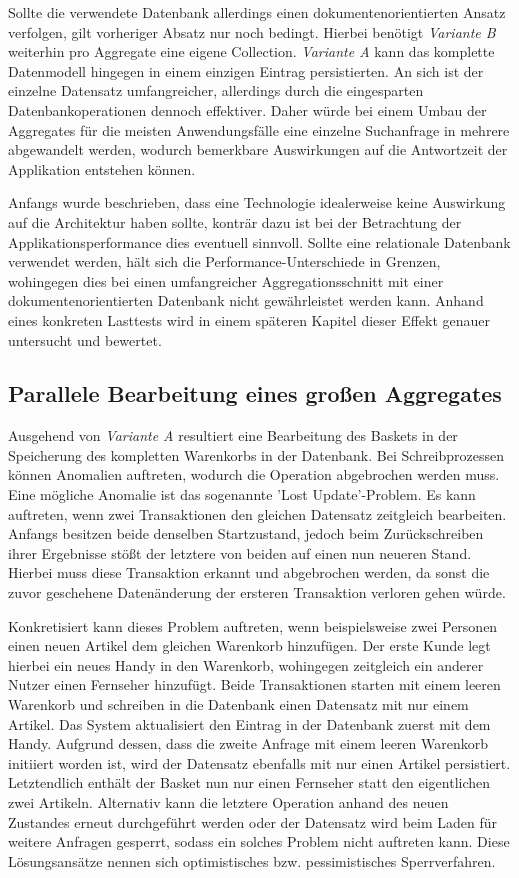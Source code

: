 Sollte die verwendete Datenbank allerdings einen dokumentenorientierten Ansatz verfolgen, gilt vorheriger Absatz nur noch bedingt. Hierbei benötigt \emph{Variante B} weiterhin pro Aggregate eine eigene \gls{Collection}. \emph{Variante A} kann das komplette Datenmodell hingegen in einem einzigen Eintrag persistierten. An sich ist der einzelne Datensatz umfangreicher, allerdings durch die eingesparten Datenbankoperationen dennoch effektiver. Daher würde bei einem Umbau der Aggregates für die meisten Anwendungsfälle eine einzelne Suchanfrage in mehrere abgewandelt werden, wodurch bemerkbare Auswirkungen auf die Antwortzeit der Applikation entstehen können. 

Anfangs wurde beschrieben, dass eine Technologie idealerweise keine Auswirkung auf die Architektur haben sollte, konträr dazu ist bei der Betrachtung der Applikationsperformance dies eventuell sinnvoll. Sollte eine relationale Datenbank verwendet werden, hält sich die Performance-Unterschiede in Grenzen, wohingegen dies bei einen umfangreicher Aggregationsschnitt mit einer dokumentenorientierten Datenbank nicht gewährleistet werden kann. Anhand eines konkreten Lasttests wird in einem späteren Kapitel dieser Effekt genauer untersucht und bewertet.

\subsection{Parallele Bearbeitung eines großen Aggregates}

Ausgehend von \emph{Variante A} resultiert eine Bearbeitung des Baskets in der Speicherung des kompletten Warenkorbs in der Datenbank. Bei Schreibprozessen können Anomalien auftreten, wodurch die Operation abgebrochen werden muss. Eine mögliche Anomalie ist das sogenannte 'Lost Update'-Problem. Es kann auftreten, wenn zwei Transaktionen den gleichen Datensatz zeitgleich bearbeiten. Anfangs besitzen beide denselben Startzustand, jedoch beim Zurückschreiben ihrer Ergebnisse stößt der letztere von beiden auf einen nun neueren Stand. Hierbei muss diese Transaktion erkannt und abgebrochen werden, da sonst die zuvor geschehene Datenänderung der ersteren Transaktion verloren gehen würde.

Konkretisiert kann dieses Problem auftreten, wenn beispielsweise zwei Personen einen neuen Artikel dem gleichen Warenkorb hinzufügen. Der erste Kunde legt hierbei ein neues Handy in den Warenkorb, wohingegen zeitgleich ein anderer Nutzer einen Fernseher hinzufügt. Beide Transaktionen starten mit einem leeren Warenkorb und schreiben in die Datenbank einen Datensatz mit nur einem Artikel. Das System aktualisiert den Eintrag in der Datenbank zuerst mit dem Handy. Aufgrund dessen, dass die zweite Anfrage mit einem leeren Warenkorb initiiert worden ist, wird der Datensatz ebenfalls mit nur einen Artikel persistiert. Letztendlich enthält der Basket nun nur einen Fernseher statt den eigentlichen zwei Artikeln. Alternativ kann die letztere Operation anhand des neuen Zustandes erneut durchgeführt werden oder der Datensatz wird beim Laden für weitere Anfragen gesperrt, sodass ein solches Problem nicht auftreten kann. Diese Lösungsansätze nennen sich optimistisches bzw. pessimistisches Sperrverfahren. 

